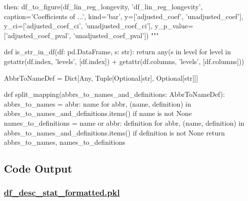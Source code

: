 \documentclass[11pt]{article}
\begin{document}
\begin{python}
    then:
    df_to_figure(df_lin_reg_longevity, 'df_lin_reg_longevity', caption='Coefficients of ...', kind='bar',  
        y=['adjusted_coef', 'unadjusted_coef'], 
        y_ci=['adjusted_coef_ci', 'unadjusted_coef_ci'], 
        y_p_value=['adjusted_coef_pval', 'unadjusted_coef_pval'])
    """


def is_str_in_df(df: pd.DataFrame, s: str):
    return any(s in level for level in getattr(df.index, 'levels', [df.index]) + getattr(df.columns, 'levels', [df.columns]))

AbbrToNameDef = Dict[Any, Tuple[Optional[str], Optional[str]]]

def split_mapping(abbrs_to_names_and_definitions: AbbrToNameDef):
    abbrs_to_names = {abbr: name for abbr, (name, definition) in abbrs_to_names_and_definitions.items() if name is not None}
    names_to_definitions = {name or abbr: definition for abbr, (name, definition) in abbrs_to_names_and_definitions.items() if definition is not None}
    return abbrs_to_names, names_to_definitions

\end{python}



\subsection{Code Output}
\hypertarget{file-df-desc-stat-formatted-pkl}{}

\subsubsection*{\hyperlink{file-df-desc-stat-pkl}{df\_desc\_stat\_formatted.pkl}}
\end{document}
